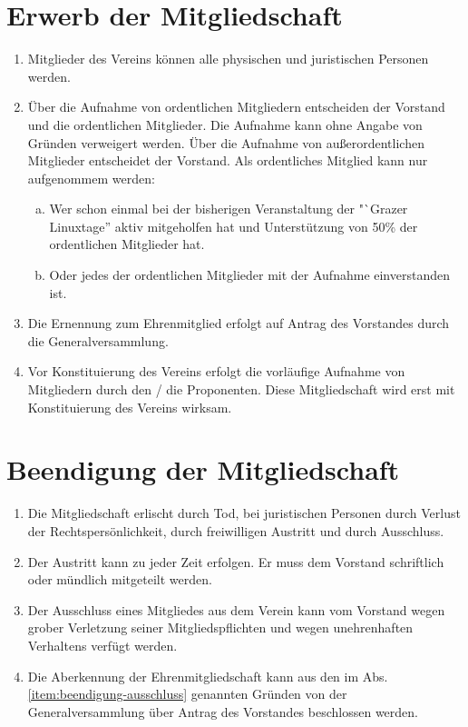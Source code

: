 \documentclass[a4paper,12pt]{article}
\begin{document}
\section{Erwerb der Mitgliedschaft} %
\label{sec:Mitgliedschaft-Erwerb}
\begin{enumerate}
\item Mitglieder des Vereins können alle physischen und juristischen Personen werden.
\item  Über die Aufnahme von ordentlichen Mitgliedern entscheiden der Vorstand und die ordentlichen Mitglieder. Die Aufnahme kann ohne Angabe von Gründen verweigert werden. Über die Aufnahme von außerordentlichen Mitglieder entscheidet der Vorstand. Als ordentliches Mitglied kann nur aufgenommem werden:
\begin{enumerate}[(a)]
  \item Wer schon einmal bei der bisherigen Veranstaltung der "`Grazer Linuxtage'' aktiv mitgeholfen hat und Unterstützung von 50\% der ordentlichen Mitglieder hat.
  \item Oder jedes der ordentlichen Mitglieder mit der Aufnahme einverstanden ist.
\end{enumerate}
\item Die Ernennung zum Ehrenmitglied erfolgt auf Antrag des Vorstandes durch die Generalversammlung.
\item Vor Konstituierung des Vereins erfolgt die vorläufige Aufnahme von Mitgliedern durch den / die Proponenten. Diese Mitgliedschaft wird erst mit Konstituierung des Vereins wirksam.
\end{enumerate}

\section{Beendigung der Mitgliedschaft} %
\label{sec:Mitgliedschaft-Beendigung}
\begin{enumerate}
\item Die Mitgliedschaft erlischt durch Tod, bei juristischen Personen durch Verlust der Rechtspersönlichkeit, durch freiwilligen Austritt und durch Ausschluss.
\item Der Austritt kann zu jeder Zeit erfolgen. Er muss dem Vorstand schriftlich oder mündlich mitgeteilt werden.
\item\label{item:beendigung-ausschluss} Der Ausschluss eines Mitgliedes aus dem Verein kann vom Vorstand wegen grober Verletzung seiner Mitgliedspflichten und wegen unehrenhaften Verhaltens verfügt werden.
\item Die Aberkennung der Ehrenmitgliedschaft kann aus den im Abs. \ref{item:beendigung-ausschluss} genannten Gründen von der Generalversammlung über Antrag des Vorstandes beschlossen werden.
\end{enumerate}
\end{document}
